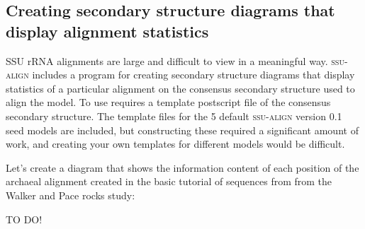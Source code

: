 \subsection{Creating secondary structure diagrams that
  display alignment statistics}

SSU rRNA alignments are large and difficult to view in a meaningful
way. \textsc{ssu-align} includes a program  for
creating secondary structure diagrams that display statistics of a
particular alignment on the consensus secondary structure used to
align the model. To use  requires a template
postscript file of the consensus secondary structure. The template
files for the 5 default \textsc{ssu-align} version 0.1 seed models are
included, but constructing these required a significant amount of
work, and creating your own templates for different models would be
difficult. 

Let's create a diagram that shows the information content of each
position of the archaeal alignment created in the basic tutorial of
sequences from from the Walker and Pace
rocks study:

TO DO!

